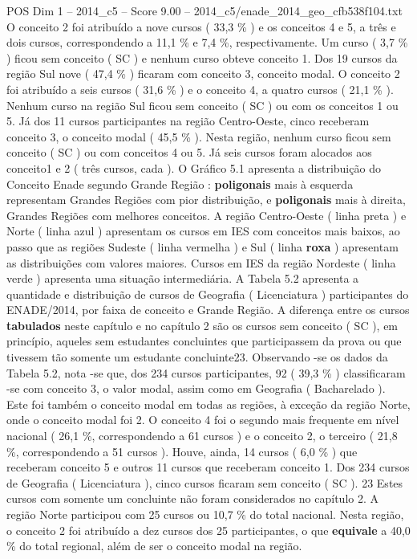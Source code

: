 \begin{textsample}{POS Dim 1 – 2014\_c5 – Score 9.00 – 2014\_c5/enade\_2014\_geo\_cfb538f104.txt}
O conceito 2 foi atribuído a nove cursos ( 33,3 \% ) e os conceitos 4 e 5, a três e dois cursos, correspondendo a 11,1 \% e 7,4 \%, respectivamente.
Um curso ( 3,7 \% ) ficou sem conceito ( SC ) e nenhum curso obteve conceito 1.
Dos 19 cursos da região Sul nove ( 47,4 \% ) ficaram com conceito 3, conceito modal.
O conceito 2 foi atribuído a seis cursos ( 31,6 \% ) e o conceito 4, a quatro cursos ( 21,1 \% ).
Nenhum curso na região Sul ficou sem conceito ( SC ) ou com os conceitos 1 ou 5.
Já dos 11 cursos participantes na região Centro-Oeste, cinco receberam conceito 3, o conceito modal ( 45,5 \% ).
Nesta região, nenhum curso ficou sem conceito ( SC ) ou com conceitos 4 ou 5.
Já seis cursos foram alocados aos conceito1 e 2 ( três cursos, cada ).
O Gráfico 5.1 apresenta a distribuição do Conceito Enade segundo Grande Região : \textbf{poligonais} mais à esquerda representam Grandes Regiões com pior distribuição, e \textbf{poligonais} mais à direita, Grandes Regiões com melhores conceitos.
A região Centro-Oeste ( linha preta ) e Norte ( linha azul ) apresentam os cursos em IES com conceitos mais baixos, ao passo que as regiões Sudeste ( linha vermelha ) e Sul ( linha \textbf{roxa} ) apresentam as distribuições com valores maiores.
Cursos em IES da região Nordeste ( linha verde ) apresenta uma situação intermediária.
A Tabela 5.2 apresenta a quantidade e distribuição de cursos de Geografia ( Licenciatura ) participantes do ENADE/2014, por faixa de conceito e Grande Região.
A diferença entre os cursos \textbf{tabulados} neste capítulo e no capítulo 2 são os cursos sem conceito ( SC ), em princípio, aqueles sem estudantes concluintes que participassem da prova ou que tivessem tão somente um estudante concluinte23.
Observando -se os dados da Tabela 5.2, nota -se que, dos 234 cursos participantes, 92 ( 39,3 \% ) classificaram -se com conceito 3, o valor modal, assim como em Geografia ( Bacharelado ).
Este foi também o conceito modal em todas as regiões, à exceção da região Norte, onde o conceito modal foi 2.
O conceito 4 foi o segundo mais frequente em nível nacional ( 26,1 \%, correspondendo a 61 cursos ) e o conceito 2, o terceiro ( 21,8 \%, correspondendo a 51 cursos ).
Houve, ainda, 14 cursos ( 6,0 \% ) que receberam conceito 5 e outros 11 cursos que receberam conceito 1.
Dos 234 cursos de Geografia ( Licenciatura ), cinco cursos ficaram sem conceito ( SC ). 23 Estes cursos com somente um concluinte não foram considerados no capítulo 2.
A região Norte participou com 25 cursos ou 10,7 \% do total nacional.
Nesta região, o conceito 2 foi atribuído a dez cursos dos 25 participantes, o que \textbf{equivale} a 40,0 \% do total regional, além de ser o conceito modal na região.

\end{textsample}
